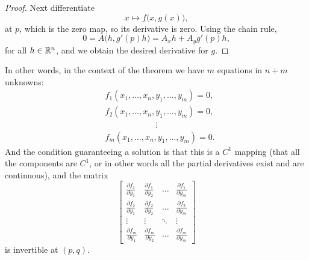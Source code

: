\begin{proof}
Next differentiate
\begin{equation*}
x\mapsto f\bigl(x,g(x)\bigr) ,
\end{equation*}
at $p$,
which is the zero map, so its derivative is zero.
Using the chain rule,
\begin{equation*}
0 = A\bigl(h,g'(p)h\bigr) = A_xh + A_yg'(p)h ,
\end{equation*}
for all $h \in {\mathbb{R}}^{n}$,
and we obtain the desired derivative for $g$.
\end{proof}

In other words, in the context of the theorem we have
$m$ equations in $n+m$ unknowns:
\begin{align*}
& f_1 (x_1,\ldots,x_n,y_1,\ldots,y_m) = 0 , \\
& f_2 (x_1,\ldots,x_n,y_1,\ldots,y_m) = 0 , \\
& \qquad \qquad \qquad  \vdots \\
& f_m (x_1,\ldots,x_n,y_1,\ldots,y_m) = 0 .
\end{align*}
And the condition guaranteeing a solution is that this is a $C^1$ mapping (that all the components are
$C^1$, or in other words all the partial derivatives exist
and are continuous), and the matrix
\begin{equation*}
\begin{bmatrix}
\frac{\partial f_1}{\partial y_1}
&
\frac{\partial f_1}{\partial y_2}
& \ldots &
\frac{\partial f_1}{\partial y_m}
\\[6pt]
\frac{\partial f_2}{\partial y_1}
&
\frac{\partial f_2}{\partial y_2}
& \ldots &
\frac{\partial f_2}{\partial y_m}
\\
\vdots & \vdots & \ddots & \vdots
\\
\frac{\partial f_m}{\partial y_1}
&
\frac{\partial f_m}{\partial y_2}
& \ldots &
\frac{\partial f_m}{\partial y_m}
\end{bmatrix}
\end{equation*}
is invertible at $(p,q)$.

